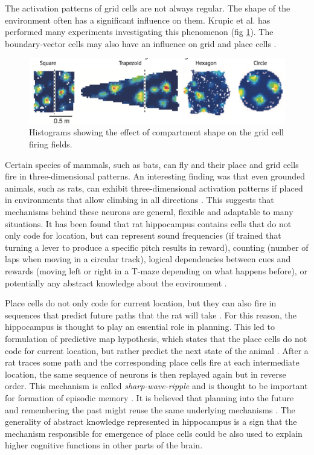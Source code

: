 \documentclass[12pt]{article}
\begin{document}
The activation patterns of grid cells are not always regular. The shape of the environment often has a significant influence on them. Krupic et al. \cite{Kurpic} has performed many experiments investigating this phenomenon (fig \ref{fig:kurpic}). The boundary-vector cells may also have an influence on grid and place cells \cite{boundary_vector_cells}.
\begin{figure}[!htbp]
	\centering
	\includegraphics[width=12cm]{kurpic}
	\caption{Histograms showing the effect of compartment shape on the grid cell firing fields.}
	\label{fig:kurpic}
\end{figure}
Certain species of mammals, such as bats, can fly and their place and grid cells fire in three-dimensional patterns. An interesting finding was that even grounded animals, such as rats,
can exhibit three-dimensional activation patterns if placed in environments that allow climbing in all directions \cite{grid_cells_3d}. This suggests that mechanisms behind these neurons are general, flexible and adaptable to many situations.
It has been found that rat hippocampus contains cells that do not only code for location, but can represent sound frequencies (if trained that turning a lever to produce a specific pitch results in reward), counting (number of laps when moving in a circular track), logical dependencies between cues and rewards (moving left or right in a T-maze depending on what happens before), or potentially any abstract knowledge about the environment \cite{hippocampus_abstract_geometry}. 

Place cells do not only code for current location, but they can also fire in sequences that predict future paths that the rat will take \cite{place_cell_sequences}. For this reason, the hippocampus is thought to play an essential role in planning. This led to formulation of predictive map hypothesis, which states that the place cells do not code for current location, but rather predict the next state of the animal \cite{predictive_map}. After a rat traces some path and the corresponding place cells fire at each intermediate location, the same sequence of  neurons is then replayed again but in reverse order. This mechanism is called \textit{sharp-wave-ripple} and is thought to be important for formation of episodic memory \cite{shard_wave_ripple,alternating_sequences}. It is believed that planning into the future and remembering the past might reuse the same underlying mechanisms \cite{past_and_future}.  The generality of abstract knowledge represented in hippocampus is a sign that the mechanism responsible for emergence of place cells could be also used to explain higher cognitive functions in other parts of the brain.
\end{document}
